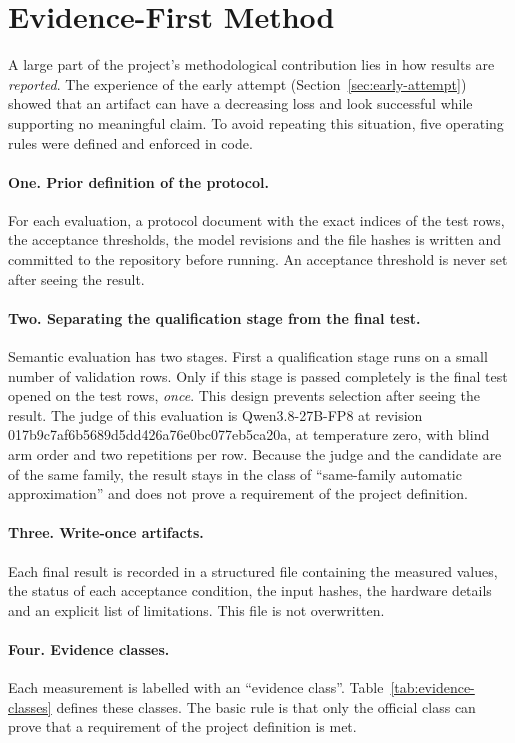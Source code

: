 \section{Evidence-First Method}
\label{sec:evidence-first}

A large part of the project's methodological contribution lies in how results are
\emph{reported}. The experience of the early attempt (Section~\ref{sec:early-attempt})
showed that an artifact can have a decreasing loss and look successful while supporting
no meaningful claim. To avoid repeating this situation, five operating rules were defined
and enforced in code.

\paragraph{One. Prior definition of the protocol.} For each evaluation, a protocol document
with the exact indices of the test rows, the acceptance thresholds, the model revisions and
the file hashes is written and committed to the repository before running. An acceptance
threshold is never set after seeing the result.

\paragraph{Two. Separating the qualification stage from the final test.} Semantic
evaluation has two stages. First a qualification stage runs on a small number of
validation rows. Only if this stage is passed completely is the final test opened on the
test rows, \emph{once}. This design prevents selection after seeing the result. The judge of
this evaluation is Qwen3.8-27B-FP8 at revision
017b9c7af6b5689d5dd426a76e0bc077eb5ca20a, at temperature zero, with blind arm order and two
repetitions per row. Because the judge and the candidate are of the same family, the result
stays in the class of ``same-family automatic approximation'' and does not prove a
requirement of the project definition.

\paragraph{Three. Write-once artifacts.} Each final result is recorded in a structured file
containing the measured values, the status of each acceptance condition, the input hashes,
the hardware details and an explicit list of limitations. This file is not overwritten.

\paragraph{Four. Evidence classes.} Each measurement is labelled with an ``evidence class''.
Table~\ref{tab:evidence-classes} defines these classes. The basic rule is that only the
official class can prove that a requirement of the project definition is met.

